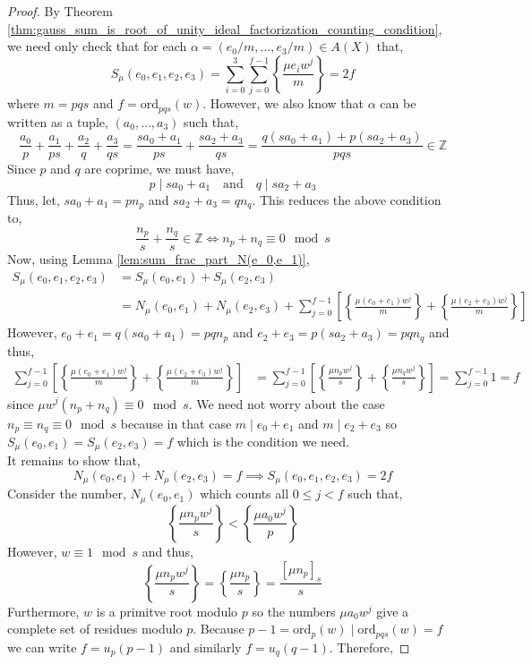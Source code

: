 \documentclass{article}
\newcommand{\Z}{\mathbb{Z}}
\newcommand{\divides}{\mid}
\newcommand{\ord}[0]{\mathrm{ord}}
\theoremstyle{definition}
\theoremstyle{definition}
\theoremstyle{remark}
\begin{document}
\begin{proof}
By Theorem \ref{thm:gauss_sum_is_root_of_unity_ideal_factorization_counting_condition}, we need only check that for each $\alpha = (e_0 / m, \dots, e_3/m) \in A(X)$ that,
\[ S_\mu(e_0, e_1, e_2, e_3) = \sum_{i = 0}^3 \sum_{j = 0}^{f-1} \left\{ \frac{\mu e_i w^j}{m} \right\} = 2 f \]
where $m = pqs$ and $f = \ord_{pqs}(w)$. However, we also know that $\alpha$ can be written as a tuple, $(a_0, \dots, a_3)$ such that,
\[ \frac{a_0}{p} + \frac{a_1}{ps} + \frac{a_2}{q} + \frac{a_3}{qs} = \frac{sa_0 + a_1}{ps} + \frac{s a_2 + a_3}{qs} = \frac{q (sa_0 + a_1) + p(s a_2 + a_3)}{pqs} \in \Z \]
Since $p$ and $q$ are coprime, we must have,
\[ p \divides s a_0 + a_1 \quad \text{and} \quad q \divides s a_2 + a_3 \]
Thus, let, $s a_0 + a_1 = p n_p$ and $s a_2 + a_3 = q n_q$. This reduces the above condition to,
\[ \frac{n_p}{s} + \frac{n_q}{s} \in \Z  \iff n_p + n_q \equiv 0 \mod{s} \]
Now, using Lemma \ref{lem:sum_frac_part_N(e_0,e_1)},
\begin{align*}
S_\mu(e_0, e_1, e_2, e_3) & = S_\mu(e_0, e_1) + S_\mu(e_2, e_3)
\\
& = N_\mu(e_0, e_1) + N_\mu(e_2, e_3) + \sum_{j = 0}^{f-1} \left[ \left\{ \frac{\mu (e_0 + e_1) w^j}{m} \right\} +  \left\{ \frac{\mu (e_2 + e_3) w^j}{m} \right\} \right]
\end{align*}
However, $e_0 + e_1 = q(s a_0 + a_1) = pq n_p$ and $e_2 + e_3 = p (s a_2 + a_3) = pq n_q$ and thus,
\begin{align*}
\sum_{j = 0}^{f-1} \left[ \left\{ \frac{\mu (e_0 + e_1) w^j}{m} \right\} + \left\{ \frac{\mu (e_2 + e_3) w^j}{m} \right\} \right] & = \sum_{j = 0}^{f - 1} \left[ \left\{ \frac{\mu n_p w^j}{s} \right\} + \left\{ \frac{\mu n_q w^j}{s} \right\}  \right] = \sum_{j = 0}^{f - 1} 1 = f
\end{align*}
since $\mu w^j(n_p + n_q) \equiv 0 \mod s$. We need not worry about the case $n_p \equiv n_q \equiv 0 \mod s$ because in that case $m \divides e_0 + e_1$ and $m \divides e_2 + e_3$ so $S_\mu(e_0, e_1) = S_\mu(e_2, e_3) = f$ which is the condition we need. 
\bigskip\\
It remains to show that,
\[ N_\mu(e_0, e_1) + N_\mu(e_2, e_3) = f \implies S_\mu(e_0, e_1, e_2, e_3) = 2 f\]
Consider the number, $N_\mu(e_0, e_1)$ which counts all $0 \le j < f$ such that,
\[ \left\{ \frac{\mu n_p w^j}{s} \right\} < \left\{ \frac{\mu a_0 w^j}{p} \right\}  \]
However, $w \equiv 1 \mod s$ and thus,
\[ \left\{ \frac{\mu n_p w^j}{s} \right\} = \left\{ \frac{\mu n_p}{s} \right\} = \frac{[\mu n_p]_s}{s} \] 
Furthermore, $w$ is a primitve root modulo $p$ so the numbers $\mu a_0 w^j$ give a complete set of residues modulo $p$. Because $p - 1 = \ord_{p}(w) \divides \ord_{pqs}(w) = f$ we can write $f = u_p(p - 1)$ and similarly $f = u_q(q - 1)$. Therefore,

\end{proof}
\end{document}
